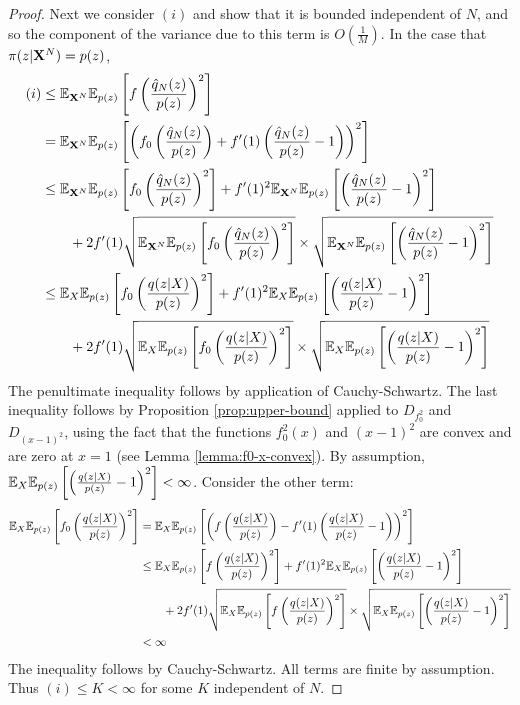 \begin{proof}
Next we consider $(i)$ and show that it is bounded independent of $N$, and so the component of the variance due to this term is $O\left(\frac{1}{M}\right)$.
In the case that $\pi(z|\mathbf{X}^N) = p(z)$,
\begin{align*}
(i) &\leq \mathbb{E}_{\mathbf{X}^N} \mathbb{E}_{p(z)} \left[ f\left( \frac{\hat{q}_N(z)}{p(z)} \right)^2\right]\\
&= \mathbb{E}_{\mathbf{X}^N} \mathbb{E}_{p(z)} \left[ \left( f_0\left( \frac{\hat{q}_N(z)}{p(z)} \right) + f'(1) \left( \frac{\hat{q}_N(z)}{p(z)} - 1 \right) \right)^2\right] \\
&\leq \mathbb{E}_{\mathbf{X}^N} \mathbb{E}_{p(z)} \left[  f_0\left( \frac{\hat{q}_N(z)}{p(z)} \right)^2\right] 
+
 f'(1)^2 \mathbb{E}_{\mathbf{X}^N} \mathbb{E}_{p(z)} \left[  \left( \frac{\hat{q}_N(z)}{p(z)} - 1 \right)^2\right] \\
 & \qquad + 2f'(1) \sqrt{\mathbb{E}_{\mathbf{X}^N} \mathbb{E}_{p(z)} \left[  f_0\left( \frac{\hat{q}_N(z)}{p(z)} \right)^2\right] } \times \sqrt{\mathbb{E}_{\mathbf{X}^N} \mathbb{E}_{p(z)} \left[  \left( \frac{\hat{q}_N(z)}{p(z)} - 1 \right)^2\right]} \\
&\leq \mathbb{E}_{X} \mathbb{E}_{p(z)} \left[  f_0\left( \frac{q(z|X)}{p(z)} \right)^2\right] 
+
 f'(1)^2 \mathbb{E}_{X} \mathbb{E}_{p(z)} \left[  \left( \frac{q(z|X)}{p(z)} - 1 \right)^2\right] \\
 & \qquad + 2f'(1) \sqrt{\mathbb{E}_{X} \mathbb{E}_{p(z)} \left[  f_0\left( \frac{q(z|X)}{p(z)} \right)^2\right] } \times \sqrt{\mathbb{E}_{X} \mathbb{E}_{p(z)} \left[  \left( \frac{q(z|X)}{p(z)} - 1 \right)^2\right]} \\
\end{align*}
The penultimate inequality follows by application of Cauchy-Schwartz.
The last inequality follows by Proposition \ref{prop:upper-bound} applied to $D_{f_0^2}$ and $D_{(x-1)^2}$, 
using the fact that the functions $f_0^2(x)$ and $(x-1)^2$ are convex and are zero at $x=1$ (see Lemma \ref{lemma:f0-x-convex}).
By assumption, $\mathbb{E}_{X} \mathbb{E}_{p(z)} \left[  \left( \frac{q(z|X)}{p(z)} - 1 \right)^2\right] < \infty$. 
Consider the other term:
\begin{align*}
    \mathbb{E}_{X} \mathbb{E}_{p(z)} \left[  f_0\left( \frac{q(z|X)}{p(z)} \right)^2\right]
    &= \mathbb{E}_{X} \mathbb{E}_{p(z)} \left[ \left( f\left( \frac{q(z|X)}{p(z)}\right) - f'(1) \left(\frac{q(z|X)}{p(z)} - 1 \right) \right)^2\right] \\
    &\leq \mathbb{E}_{X} \mathbb{E}_{p(z)} \left[  f\left( \frac{q(z|X)}{p(z)} \right)^2\right] 
    +
    f'(1)^2 \mathbb{E}_{X} \mathbb{E}_{p(z)} \left[  \left( \frac{q(z|X)}{p(z)} - 1 \right)^2\right] \\
    & \qquad + 2f'(1) \sqrt{\mathbb{E}_{X} \mathbb{E}_{p(z)} \left[  f\left( \frac{q(z|X)}{p(z)} \right)^2\right] } \times \sqrt{\mathbb{E}_{X} \mathbb{E}_{p(z)} \left[  \left( \frac{q(z|X)}{p(z)} - 1 \right)^2\right]} \\
    & < \infty
\end{align*}
The inequality follows by Cauchy-Schwartz.
All terms are finite by assumption.
Thus $(i) \leq K < \infty$ for some $K$ independent of $N$.


\end{proof}
